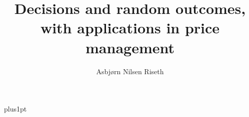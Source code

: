 \documentclass[12pt,fleqn]{ociamthesis}
\title{Decisions and random outcomes, with applications in price management}
\author{Asbj{\o}rn Nilsen Riseth}
\def\biblio{}
\begin{document}
\def\biblio{} %

\baselineskip=18pt plus1pt

\setcounter{secnumdepth}{3}
\setcounter{tocdepth}{3}


\maketitle                  %
\begin{dedication}
\end{dedication}

\begin{acknowledgementslong}
\end{acknowledgementslong}

\begin{abstractseparate}
\end{abstractseparate}

\begin{originalitylong}
  
\end{originalitylong}

\begin{romanpages}          %
  \listoftodos[Notes]
  \tableofcontents            %
  \listoffigures              %
  \listoftables               %
\end{romanpages}            %












\appendix



\end{document}
